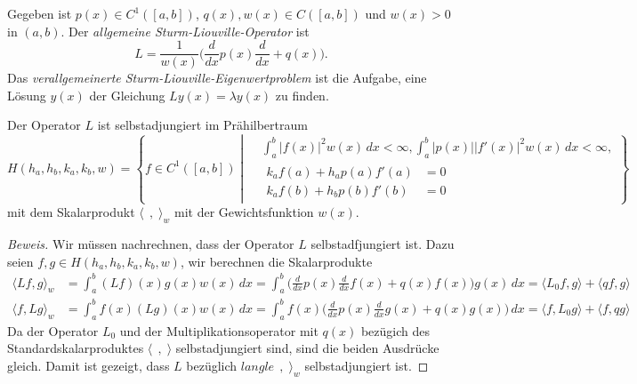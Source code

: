 \begin{definition}
Gegeben ist $p(x)\in C^1([a,b])$, $q(x),w(x)\in C([a,b])$ und $w(x)>0$
in $(a,b)$.
Der {\em allgemeine Sturm-Liouville-Operator} ist
\[
L
=
\frac{1}{w(x)}
\biggl(
\frac{d}{dx}p(x)\frac{d}{dx}
+
q(x)
\biggr).
\]
Das {\em verallgemeinerte Sturm-Liouville-Eigenwertproblem} ist die Aufgabe,
eine Lösung $y(x)$ der Gleichung
\(
Ly(x) = \lambda y(x)
\)
zu finden.
\end{definition}

\begin{satz}
Der Operator $L$ ist selbstadjungiert im Prähilbertraum
\[
H(h_a,h_b,k_a,k_b,w)
=
\left\{
f \in C^1([a,b])
\;
\left|
\;
\begin{aligned}
&\int_a^b |f(x)|^2w(x)\,dx < \infty,
\int_a^b |p(x)| |f'(x)|^2w(x)\,dx < \infty,
\\
&
\begin{aligned}
k_af(a) + h_ap(a)f'(a) &= 0 \\
k_af(b) + h_bp(b)f'(b) &= 0 
\end{aligned}
\end{aligned}
\right.
\right\}
\]
mit dem Skalarprodukt $\langle \;\,,\;\rangle_w$ mit der Gewichtsfunktion
$w(x)$.
\end{satz}

\begin{proof}[Beweis]
Wir müssen nachrechnen, dass der Operator $L$ selbstadfjungiert ist.
Dazu seien $f,g\in H(h_a,h_b,k_a,k_b,w)$, wir berechnen die
Skalarprodukte
\begin{align*}
\langle Lf,g\rangle_w
&=
\int_a^b (Lf)(x)g(x)w(x)\,dx
=
\int_a^b
\biggl(
\frac{d}{dx}p(x)\frac{d}{dx}f(x) + 
q(x) f(x)
\biggr) g(x)\,dx
=
\langle L_0f,g\rangle + \langle qf,g\rangle
\\
\langle f,Lg\rangle_w
&=
\int_a^b f(x)(Lg)(x)w(x)\,dx
=
\int_a^b
f(x)
\biggl(
\frac{d}{dx}p(x)\frac{d}{dx}g(x) + 
q(x) g(x)
\biggr) \,dx
=
\langle f,L_0g\rangle + \langle f,qg\rangle
\end{align*}
Da der Operator $L_0$ und der Multiplikationsoperator mit $q(x)$ bezügich
des Standardskalarproduktes $\langle\;\,,\;\rangle$ selbstadjungiert sind,
sind die beiden Ausdrücke gleich.
Damit ist gezeigt, dass $L$ bezüglich $langle\;\,,\;\rangle_w$
selbstadjungiert ist.
\end{proof}
